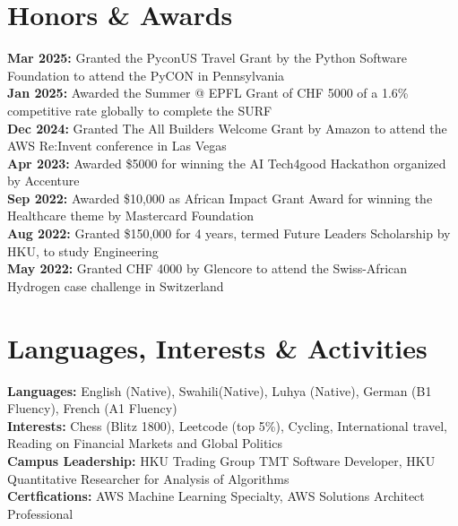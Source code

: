\documentclass[letterpaper,11pt]{article}
\begin{document}
\vspace{-15pt} %

\section{Honors \& Awards}
 \begin{itemize}[leftmargin=0.15in, label={}]
    \small{\item{
     \textbf{Mar 2025:} Granted the PyconUS Travel Grant by the Python Software Foundation to attend the PyCON in Pennsylvania\\
     \textbf{Jan 2025:} Awarded the Summer @ EPFL Grant of CHF 5000 of a 1.6\% competitive rate globally to complete the SURF\\
     \textbf{Dec 2024:} Granted The All Builders Welcome Grant by Amazon to attend the AWS Re:Invent conference in Las Vegas\\
     \textbf{Apr 2023:} Awarded \$5000 for winning the AI Tech4good Hackathon organized by Accenture\\
     \textbf{Sep 2022:} Awarded \$10,000 as African Impact Grant Award for winning the Healthcare theme by Mastercard Foundation\\
     \textbf{Aug 2022:} Granted \$150,000 for 4 years, termed Future Leaders Scholarship by HKU, to study Engineering\\
     \textbf{May 2022:} Granted CHF 4000 by Glencore to attend the Swiss-African Hydrogen case challenge in Switzerland
    }}
 \end{itemize}
\vspace{-15pt} %

\section{Languages, Interests \& Activities}
 \begin{itemize}[leftmargin=0.15in, label={}]
    \small{\item{
     \textbf{Languages:} English (Native), Swahili(Native), Luhya (Native), German (B1 Fluency), French (A1 Fluency)\\
     \textbf{Interests:} Chess (Blitz 1800), Leetcode (top 5\%), Cycling, International travel, Reading on Financial Markets and Global Politics\\
     \textbf{Campus Leadership:} HKU Trading Group TMT Software Developer, HKU Quantitative Researcher for Analysis of Algorithms\\
     \textbf{Certfications:} AWS Machine Learning Specialty, AWS Solutions Architect Professional\\
     }}
 \end{itemize}
 \vspace{-15pt} %
\end{document}
